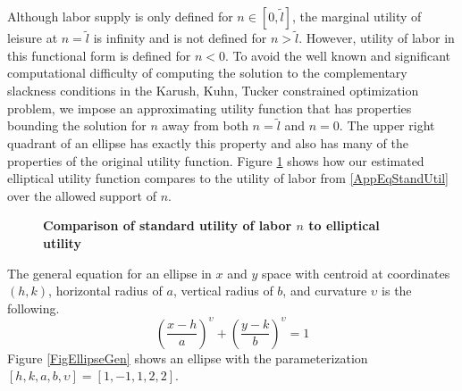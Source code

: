 \documentclass[letterpaper,12pt]{article}
\theoremstyle{definition}
\begin{document}
  Although labor supply is only defined for $n\in[0,\tilde{l}]$, the marginal utility of leisure at $n=\tilde{l}$ is infinity and is not defined for $n>\tilde{l}$. However, utility of labor in this functional form is defined for $n<0$. To avoid the well known and significant computational difficulty of computing the solution to the complementary slackness conditions in the Karush, Kuhn, Tucker constrained optimization problem, we impose an approximating utility function that has properties bounding the solution for $n$ away from both $n=\tilde{l}$ and $n=0$. The upper right quadrant of an ellipse has exactly this property and also has many of the properties of the original utility function. Figure \ref{FigUtilCompar} shows how our estimated elliptical utility function compares to the utility of labor from \eqref{AppEqStandUtil} over the allowed support of $n$.

  \begin{figure}[htb]\centering \captionsetup{width=4.0in}
    \caption{\label{FigUtilCompar}\textbf{Comparison of standard utility of labor $n$ to elliptical utility}}
  \end{figure}

  The general equation for an ellipse in $x$ and $y$ space with centroid at coordinates $(h,k)$, horizontal radius of $a$, vertical radius of $b$, and curvature $\upsilon$ is the following.
  \begin{equation}\label{AppEqEllipseGen}
    \left(\frac{x - h}{a}\right)^\upsilon + \left(\frac{y - k}{b}\right)^\upsilon = 1
  \end{equation}
  Figure \ref{FigEllipseGen} shows an ellipse with the parameterization $[h,k,a,b,\upsilon]=[1,-1,1,2,2]$.
\end{document}
